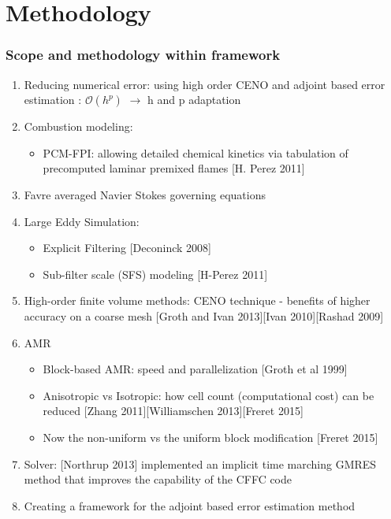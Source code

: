 \documentclass{beamer}
\begin{document}

\section[Methodology]{Methodology}
\begin{frame}%
\frametitle{Scope and methodology within framework}
\scriptsize

\begin{enumerate}[1.]
\item Reducing numerical error: using high order CENO and adjoint based error estimation : {$\mathcal{O}(h^p)$} $\rightarrow$ h and p adaptation

\item Combustion modeling:
  \begin{itemize}
   \tiny
   \item PCM-FPI: allowing detailed chemical kinetics via tabulation of precomputed laminar premixed flames [H. Perez 2011]
   \end{itemize}  


\item Favre averaged Navier Stokes governing equations

\item Large Eddy Simulation:
  \begin{itemize}
  \tiny
   \item Explicit Filtering [Deconinck 2008]
   \item Sub-filter scale (SFS) modeling [H-Perez 2011]
  \end{itemize}

\item High-order finite volume methods: CENO technique - benefits of higher accuracy on a coarse mesh [Groth and Ivan 2013][Ivan 2010][Rashad 2009]


\item AMR
   \begin{itemize}
   \tiny
   \item Block-based AMR: speed and parallelization [Groth et al 1999]
   \item Anisotropic vs Isotropic: how cell count (computational cost) can be reduced [Zhang 2011][Williamschen 2013][Freret 2015]
   \item Now the non-uniform vs the uniform block modification [Freret 2015]
   \end{itemize}
   
\item Solver: [Northrup 2013] implemented an implicit time marching GMRES method that improves the capability of the CFFC code   
   
\item Creating a framework for the adjoint based error estimation method
\end{enumerate}
\end{frame}
\end{document}
